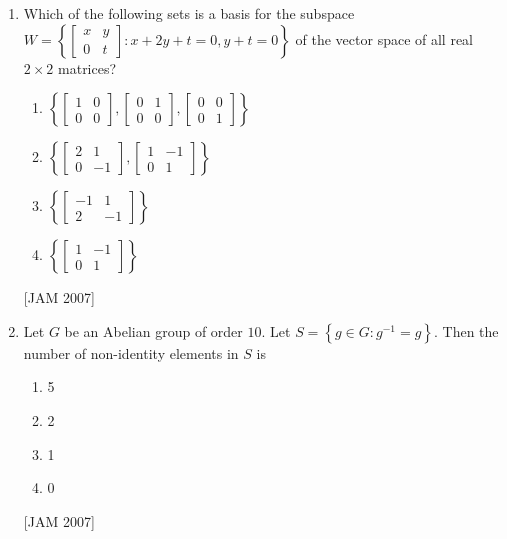 \begin{enumerate}
\item Which of the following sets is a basis for the subspace
$W=\left\{\left[\begin{array}{ll}x & y \\ 0 & t\end{array}\right]: x+2 y+t=0, y+t=0\right\}$
of the vector space of all real $2 \times 2$ matrices?
\begin{enumerate}
    
\item $\left\{\left[\begin{array}{ll}1 & 0 \\ 0 & 0\end{array}\right],\left[\begin{array}{ll}0 & 1 \\ 0 & 0\end{array}\right],\left[\begin{array}{ll}0 & 0 \\ 0 & 1\end{array}\right]\right\}$

\item $\left\{\left[\begin{array}{cc}2 & 1 \\ 0 & -1\end{array}\right],\left[\begin{array}{cc}1 & -1 \\ 0 & 1\end{array}\right]\right\}$

\item $\left\{\left[\begin{array}{cc}-1 & 1 \\ 2 & -1\end{array}\right]\right\}$

\item $\left\{\left[\begin{array}{cc}1 & -1 \\ 0 & 1\end{array}\right]\right\}$
\end{enumerate}
 \hfill [JAM 2007]




\item Let $G$ be an Abelian group of order $10$. Let $S=\left\{g \in G: g^{-1}=g\right\}$. Then the number of non-identity elements in $S$ is
\begin{enumerate}
\item 5
\item 2
\item 1
\item 0
\end{enumerate}
 \hfill [JAM 2007]



\end{enumerate}

